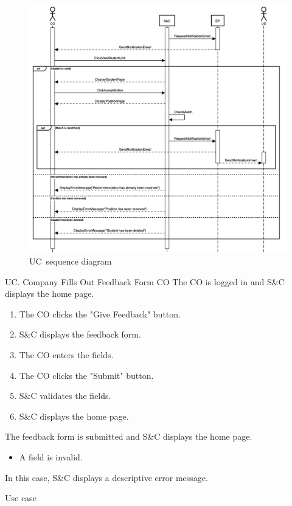 \begin{figure}
    \centering
    \includegraphics[width=16cm]{images/sequence-diagrams/company-accepts-recommendation.png}
    \caption{UC\theuc\ sequence diagram}
\end{figure}


\clearpage
\begin{usecase}
    {UC\theuc. Company Fills Out Feedback Form}
    {CO}
    {The CO is logged in and S\&C displays the home page.}
    {\begin{enumerate}[leftmargin=*]
        \item The CO clicks the "Give Feedback" button.
        \item S\&C displays the feedback form.
        \item The CO enters the fields.
        \item The CO clicks the "Submit" button.
        \item S\&C validates the fields.
        \item S\&C displays the home page.
    \end{enumerate}}
    {The feedback form is submitted and S\&C displays the home page.}
    {\begin{itemize}[leftmargin=*, label=\tiny\textbullet]
        \item A field is invalid.
    \end{itemize}
    In this case, S\&C displays a descriptive error message.}
    {Use case \theuc}
\end{usecase}

